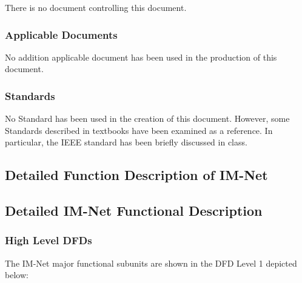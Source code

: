 \documentclass[letterpaper,12pt]{article}
\begin{document}
{There is no document controlling this document.

\textcolor{subsubsection}{\subsubsection{Applicable Documents}}

No addition applicable document has been used in the production of this document.

\textcolor{subsection}{\subsubsection{Standards}}

No Standard has been used in the creation of this document. However, some Standards described in textbooks have been examined as a reference. In particular, the IEEE standard has been briefly discussed in class.

\eject

\textcolor{section}{\section{Detailed Function Description of IM-Net}}

\textcolor{subsection}{\subsection{Detailed IM-Net Functional Description}}

\textcolor{subsubsection}{\subsubsection{High Level DFDs}}

The IM-Net major functional subunits are shown in the DFD Level 1 depicted below:

}
\end{document}
